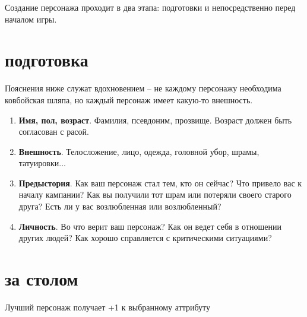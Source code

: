 \documentclass[a4paper,12pt,twocolumn]{book}
\begin{document}
\lettrine{С}{}оздание персонажа проходит в два этапа: подготовки и непосредственно перед началом игры.

\section{подготовка}

Пояснения ниже служат вдохновением -- не каждому персонажу необходима ковбойская шляпа, но каждый персонаж имеет какую-то внешность.

\begin{enumerate}
  \item \textbf{Имя, пол, возраст}. Фамилия, псевдоним, прозвище. Возраст должен быть согласован с расой.
  \item \textbf{Внешность}. Телосложение, лицо, одежда, головной убор, шрамы, татуировки...
  \item \textbf{Предыстория}. Как ваш персонаж стал тем, кто он сейчас? Что привело вас к началу кампании? Как вы получили тот шрам или потеряли своего старого друга? Есть ли у вас возлюбленная или возлюбленный?
  \item \textbf{Личность}. Во что верит ваш персонаж? Как он ведет себя в отношении других людей? Как хорошо справляется с критическими ситуациями?
\end{enumerate}

\section{за столом}

Лучший персонаж получает +1 к выбранному аттрибуту
\end{document}
